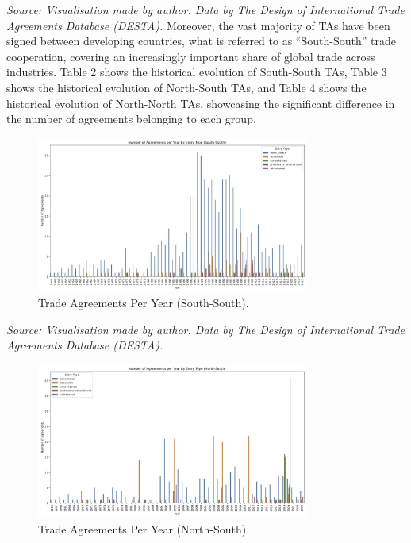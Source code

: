 \documentclass[12pt]{article}%
\begin{document}
%
\FloatBarrier%
\textit{Source: Visualisation made by author. Data by The Design of International Trade Agreements Database (DESTA).}%
\FloatBarrier%
Moreover, the vast majority of TAs have been signed between developing countries, what is referred to as “South{-}South” trade cooperation, covering an increasingly important share of global trade across industries. Table 2 shows the historical evolution of South{-}South TAs, Table 3 shows the historical evolution of North{-}South TAs, and Table 4 shows the historical evolution of North{-}North TAs, showcasing the significant difference in the number of agreements belonging to each group.%


\begin{figure}[h!]%
\centering%
\includegraphics[width=0.8\textwidth]{figures/agreements_per_year_South-South.jpg}%
\caption{Trade Agreements Per Year (South{-}South).}%
\end{figure}

%
\FloatBarrier%
\textit{Source: Visualisation made by author. Data by The Design of International Trade Agreements Database (DESTA).}%
\FloatBarrier%


\begin{figure}[h!]%
\centering%
\includegraphics[width=0.8\textwidth]{figures/agreements_per_year_North-South.jpg}%
\caption{Trade Agreements Per Year (North{-}South).}%
\end{figure}
\end{document}
